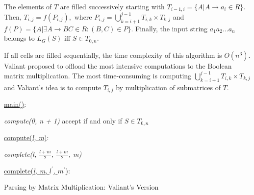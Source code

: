 The elements of $T$ are filled successively starting with $T_{i - 1, i} = \{ A | A \rightarrow a_{i} \in R\}.$
Then, $T_{i, j} = f(P_{i, j}),$ where
$P_{i, j} = \bigcup\limits_{k = i + 1}^{j - 1} T_{i,k} \times T_{k, j}$ and
$f(P) = \{A | \exists A \rightarrow BC \in R : (B, C) \in P\}.$
Finally, the input string $a_{1}a_{2} \dots a_{n}$ belongs to $L_{G}(S)$ iff $S \in T_{0, n}$.

If all cells are filled sequentially, the time complexity of this algorithm is $O(n^3)$.
Valiant proposed to offload the most intensive computations to the Boolean matrix multiplication. 
The most time-consuming is computing $\bigcup\limits_{k = i + 1}^{j - 1} T_{i, k} \times T_{k, j}$ and Valiant's idea is to compute $T_{i, j}$ by multiplication of submatrices of $T$.

\begin{algorithm}[h]
\SetAlgoNoLine
{}
\underline{main()}{:}{

 \textit{compute(0, n + 1)\;}
 accept if and only if $S \in T_{0, n}$
 \linebreak
 }

\underline{compute(\textit{l, m})}{:}{

 \textit{complete(l, $\frac{l+m}{2}$, $\frac{l+m}{2}$, m)}
 \linebreak
 }

\underline{complete(\textit{l, m}, $l^\prime$, $m^\prime$)}{:}{

 }
\caption{Parsing by Matrix Multiplication: Valiant's Version}
\label{algo:valiant}
\end{algorithm}

